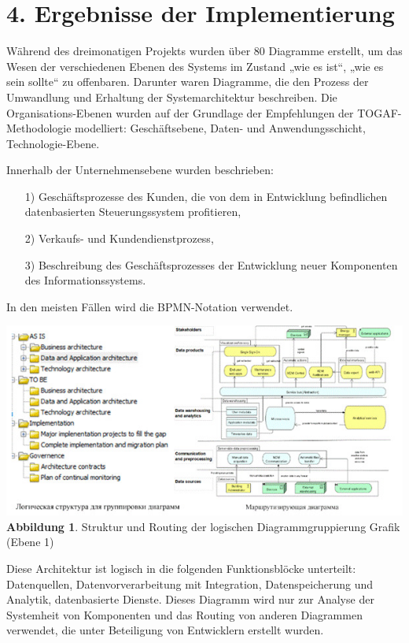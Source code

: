 \documentclass[11pt,a4paper]{article}
\begin{document}
\section*{4. Ergebnisse der Implementierung}
Während des dreimonatigen Projekts wurden über 80 Diagramme erstellt, um das
Wesen der verschiedenen Ebenen des Systems im Zustand „wie es ist“, „wie es
sein sollte“ zu offenbaren.  Darunter waren Diagramme, die den Prozess der
Umwandlung und Erhaltung der Systemarchitektur beschreiben. Die
Organisations-Ebenen wurden auf der Grundlage der Empfehlungen der
TOGAF-Methodologie modelliert: Geschäftsebene, Daten- und Anwendungsschicht,
Technologie-Ebene.

Innerhalb der Unternehmensebene wurden beschrieben: 
\begin{itemize}
\item[1)] Geschäftsprozesse des Kunden, die von dem in Entwicklung
  befindlichen datenbasierten Steuerungssystem profitieren,
\item[2)] Verkaufs- und Kundendienstprozess,
\item[3)] Beschreibung des Geschäftsprozesses der Entwicklung neuer
  Komponenten des Informationssystems. 
\end{itemize}
In den meisten Fällen wird die BPMN-Notation verwendet.

\begin{center}
  \includegraphics[width=.95\textwidth]{image004.jpg}\\
  \textbf{Abbildung 1}. Struktur und Routing der logischen Diagrammgruppierung
  Grafik (Ebene 1)
\end{center}
Diese Architektur ist logisch in die folgenden Funktionsblöcke unterteilt:
Datenquellen, Datenvorverarbeitung mit Integration, Datenspeicherung und
Analytik, datenbasierte Dienste. Dieses Diagramm wird nur zur Analyse der
Systemheit von Komponenten und das Routing von anderen Diagrammen verwendet,
die unter Beteiligung von Entwicklern erstellt wurden.
\end{document}
